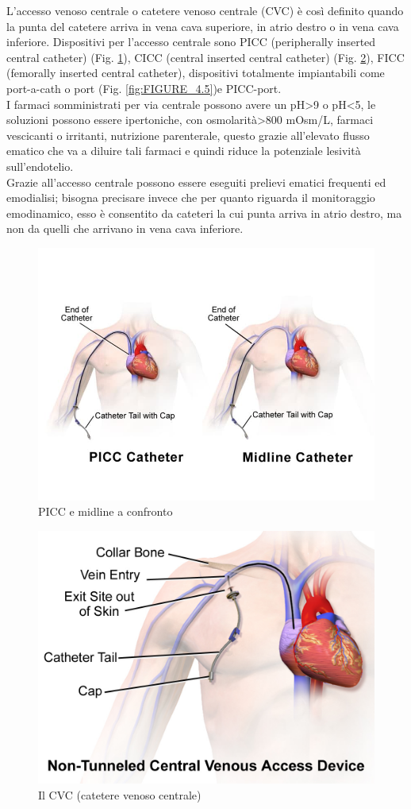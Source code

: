 L’accesso venoso centrale o catetere venoso centrale (CVC) è così definito quando la punta del catetere arriva in 
vena cava superiore, in atrio destro o in vena cava inferiore. Dispositivi per l’accesso centrale sono PICC 
(peripherally inserted central catheter) (Fig. \ref{fig:FIGURE_4.3}), CICC (central inserted central catheter) 
(Fig. \ref{fig:FIGURE_4.4}), FICC (femorally inserted central catheter), 
dispositivi totalmente impiantabili come port-a-cath o port (Fig. \ref{fig:FIGURE_4.5})e PICC-port\cite{GAVECELTracc2021}.\\
I farmaci somministrati per via centrale possono avere un pH>9 o pH<5, le soluzioni possono essere ipertoniche, con 
osmolarità>800 mOsm/L, farmaci vescicanti o irritanti, nutrizione parenterale\cite{LINEEGUIDA},
questo grazie all’elevato flusso ematico che va a diluire tali farmaci e quindi riduce 
la potenziale lesività sull’endotelio\cite{GAVECELTracc2021}.\\
Grazie all’accesso centrale possono essere eseguiti prelievi ematici frequenti ed emodialisi; bisogna precisare 
invece che per quanto riguarda il monitoraggio emodinamico, esso è consentito da cateteri 
la cui punta arriva in atrio destro, ma non da quelli che arrivano in vena cava inferiore\cite{GAVECELTracc2021}.\\

\begin{figure}[H]
    \begin{center}
    \includegraphics[width=0.6\columnwidth]{img/picc.jpeg}
    \end{center}
    \caption{PICC e midline a confronto
    \cite{img40}}
    \label{fig:FIGURE_4.3}
\end{figure}

\begin{figure}[H]
    \begin{center}
    \includegraphics[width=0.5\columnwidth]{img/CVC.png}
    \end{center}
    \caption{Il CVC (catetere venoso centrale)
    \cite{img41}}
    \label{fig:FIGURE_4.4}
\end{figure}

